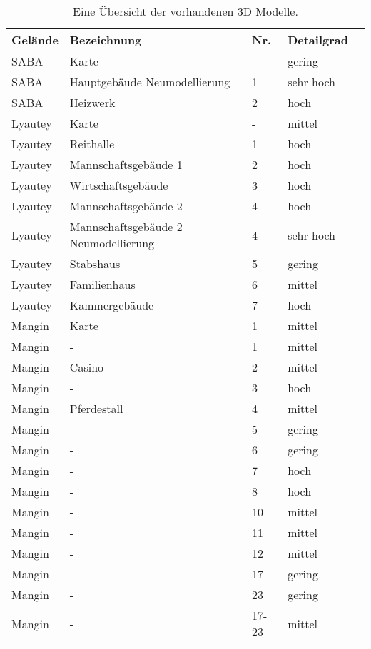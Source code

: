 \begin{table}[h]
    \centering
    \begin{tabular}{|p{}|p{}|p{}|p{}|p{}|}
    \hline
        Gelände & Bezeichnung & Nr. & Detailgrad \\ \hline
        SABA & Karte & - & gering \\ \hline
        SABA & Hauptgebäude \newline Neumodellierung & 1 & sehr hoch \\ \hline
        SABA & Heizwerk & 2 & hoch \\ \hline
        Lyautey & Karte & - & mittel \\ \hline
        Lyautey & Reithalle & 1 & hoch \\ \hline
        Lyautey & Mannschaftsgebäude 1 & 2 & hoch \\ \hline
        Lyautey & Wirtschaftsgebäude & 3 & hoch \\ \hline
        Lyautey & Mannschaftsgebäude 2 & 4 & hoch \\ \hline
        Lyautey & Mannschaftsgebäude 2 \newline Neumodellierung & 4 & sehr hoch  \\ \hline
        Lyautey & Stabshaus & 5 & gering \\ \hline
        Lyautey & Familienhaus & 6 & mittel  \\ \hline
        Lyautey & Kammergebäude & 7 & hoch  \\ \hline
        Mangin & Karte & 1 & mittel  \\ \hline
        Mangin & - & 1 & mittel  \\ \hline
        Mangin & Casino & 2 & mittel  \\ \hline
        Mangin & - & 3 & hoch  \\ \hline
        Mangin & Pferdestall & 4 & mittel  \\ \hline
        Mangin & - & 5 & gering  \\ \hline
        Mangin & - & 6 & gering  \\ \hline
        Mangin & - & 7 & hoch  \\ \hline
        Mangin & - & 8 & hoch  \\ \hline
        Mangin & - & 10 & mittel  \\ \hline
        Mangin & - & 11 & mittel  \\ \hline
        Mangin & - & 12 & mittel  \\ \hline
        Mangin & - & 17 & gering  \\ \hline
        Mangin & - & 23 & gering  \\ \hline
        Mangin & - & 17-23 & mittel  \\ \hline
    \end{tabular}
    \caption{Eine Übersicht der vorhandenen 3D Modelle.}
    \label{tab:uebersicht-3Dmodelle}
\end{table}
